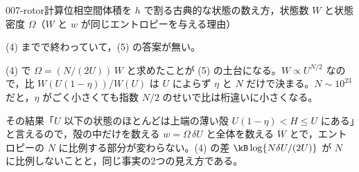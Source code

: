 \documentclass[uplatex,dvipdfmx,a4paper,11pt]{jsarticle}
\begin{document}
\begin{mondai}{007-rotor}{計算}{位相空間体積を $h$ で割る古典的な状態の数え方，状態数 $W$ と状態密度 $\Omega$（$W$ と $w$ が同じエントロピーを与える理由）}
\begin{kotaeran}
   (4) までで終わっていて，(5) の答案が無い。
\end{kotaeran}
\begin{rikai}
  \item (4) で $\Omega=(N/(2U))\,W$ と求めたことが (5) の土台になる。$W\propto U^{N/2}$ なので，比 $W(U(1-\eta))/W(U)$ は $U$ によらず $\eta$ と $N$ だけで決まる。$N\sim10^{23}$ だと，$\eta$ がごく小さくても指数 $N/2$ のせいで比は桁違いに小さくなる。
  \item その結果「$U$ 以下の状態のほとんどは上端の薄い殻 $U(1-\eta)<H\le U$ にある」と言えるので，殻の中だけを数える $w=\Omega\,\delta U$ と全体を数える $W$ とで，エントロピーの $N$ に比例する部分が変わらない。(4) の差 $\kB\log\{N\delta U/(2U)\}$ が $N$ に比例しないことと，同じ事実の2つの見え方である。
\end{rikai}
\end{mondai}
\end{document}
